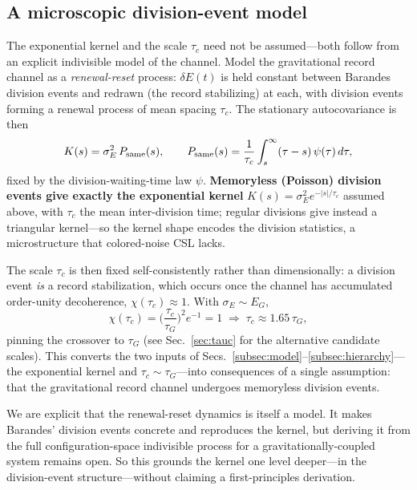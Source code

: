\documentclass[aps,prd,onecolumn,amsmath,amssymb,nofootinbib,superscriptaddress]{revtex4-2}
\begin{document}
\subsection{A microscopic division-event model}\label{subsec:micro}

The exponential kernel and the scale $\tau_c$ need not be assumed---both follow from an explicit
indivisible model of the channel. Model the gravitational record channel as a \emph{renewal-reset}
process: $\delta E(t)$ is held constant between Barandes division events and redrawn (the record
stabilizing) at each, with division events forming a renewal process of mean spacing $\tau_c$. The
stationary autocovariance is then
\begin{equation}
K(s) = \sigma_E^2\,P_{\rm same}(s),\qquad
P_{\rm same}(s) = \frac{1}{\tau_c}\int_s^{\infty}(\tau-s)\,\psi(\tau)\,d\tau,
\end{equation}
fixed by the division-waiting-time law $\psi$. \textbf{Memoryless (Poisson) division events give
exactly the exponential kernel} $K(s)=\sigma_E^2 e^{-|s|/\tau_c}$ assumed above, with $\tau_c$ the mean
inter-division time; regular divisions give instead a triangular kernel---so the kernel shape encodes
the division statistics, a microstructure that colored-noise CSL lacks.

The scale $\tau_c$ is then fixed self-consistently rather than dimensionally: a division event
\emph{is} a record stabilization, which occurs once the channel has accumulated order-unity
decoherence, $\chi(\tau_c)\approx1$. With $\sigma_E\sim E_G$,
\begin{equation}
\chi(\tau_c)=\Big(\frac{\tau_c}{\tau_G}\Big)^2 e^{-1}=1 \;\Longrightarrow\; \tau_c\approx1.65\,\tau_G,
\end{equation}
pinning the crossover to $\tau_G$ (see Sec.~\ref{sec:tauc} for the alternative candidate scales). This
converts the two inputs of Secs.~\ref{subsec:model}--\ref{subsec:hierarchy}---the exponential kernel and
$\tau_c\sim\tau_G$---into consequences of a single assumption: that the gravitational record channel
undergoes memoryless division events.

We are explicit that the renewal-reset dynamics is itself a model. It makes Barandes' division events
concrete and reproduces the kernel, but deriving it from the full configuration-space indivisible
process for a gravitationally-coupled system remains open. So this grounds the kernel one level
deeper---in the division-event structure---without claiming a first-principles derivation.
\end{document}
